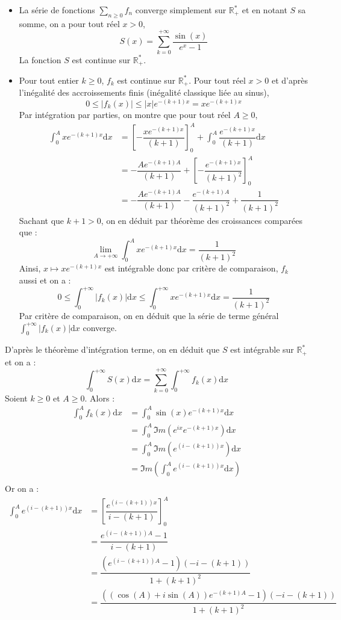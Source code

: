\documentclass[a4paper,twoside,french,10pt]{VcCours}
\newcommand{\dx}{\text{d}x}
\begin{document}
\begin{itemize}
\item La série de fonctions $\sum_{n \geq 0} f_n$ converge simplement sur $\mathbb{R}_+^*$ et en notant $S$ sa somme, on a pour tout réel $x>0$,
$$ S(x)= \sum_{k=0}^{+ \infty} \dfrac{\sin(x)}{e^x-1}$$
La fonction $S$ est continue sur $\mathbb{R}_+^*$.
\item Pour tout entier $k \geq 0$, $f_k$ est continue sur $\mathbb{R}_+^*$. Pour tout réel $x>0$ et d'après l'inégalité des accroissements finis (inégalité classique liée au sinus),
$$ 0 \leq \vert f_k(x) \vert \leq \vert x \vert e^{-(k+1)x} = x  e^{-(k+1)x}$$
Par intégration par parties, on montre que pour tout réel $A \geq 0$,
\begin{align*}
\int_0^{A} x e^{-(k+1)x} \dx & = \left[- \dfrac{xe^{-(k+1)x}}{(k+1)} \right]_0^A + \int_0^A \dfrac{e^{-(k+1)x}}{(k+1)} \dx \\
& = - \dfrac{Ae^{-(k+1)A}}{(k+1)} +  \left[- \dfrac{e^{-(k+1)x}}{(k+1)^2} \right]_0^A \\
& =  - \dfrac{Ae^{-(k+1)A}}{(k+1)} - \dfrac{e^{-(k+1)A}}{(k+1)^2} + \dfrac{1}{(k+1)^2}
\end{align*}
Sachant que $k+1>0$, on en déduit par théorème des croissances comparées que :
$$ \lim_{A \rightarrow + \infty} \int_0^{A} x e^{-(k+1)x} \dx = \dfrac{1}{(k+1)^2}$$
Ainsi, $x \mapsto x  e^{-(k+1)x}$ est intégrable donc par critère de comparaison, $f_k$ aussi et on a :
$$ 0 \leq \int_0^{+ \infty}\vert f_k(x) \vert \dx \leq  \int_0^{+ \infty} x  e^{-(k+1)x} \dx = \dfrac{1}{(k+1)^2}$$
Par critère de comparaison, on en déduit que la série de terme général $\int_0^{+ \infty}\vert f_k(x) \vert \dx$ converge.
\end{itemize}
D'après le théorème d'intégration terme, on en déduit que $S$ est intégrable sur $\mathbb{R}_+^*$ et on a :
$$ \int_0^{+ \infty} S(x) \dx = \sum_{k=0}^{+ \infty} \int_0^{+ \infty} f_k(x) \dx$$
Soient $k \geq 0$ et $A \geq 0$. Alors :
\begin{align*}
\int_0^A f_k(x) \dx &  = \int_0^A \sin(x) e^{-(k+1)x} \dx \\
& = \int_0^A \Im m(e^{ix}  e^{-(k+1)x}) \dx \\
& = \int_0^A \Im m(e^{(i-(k+1))x}) \dx \\
& = \Im m  \left(  \int_0^A e^{(i-(k+1))x} \dx \right) \\
\end{align*}
Or on a :
\begin{align*}
\int_0^A e^{(i-(k+1))x} \dx & = \left[ \dfrac{e^{(i-(k+1))x}}{i-(k+1)} \right]_0^A \\
& = \dfrac{e^{(i-(k+1))A} - 1}{i-(k+1)} \\
& = \dfrac{(e^{(i-(k+1))A} - 1)(-i-(k+1))}{1+(k+1)^2} \\
& = \dfrac{((\cos(A)+i \sin(A))e^{-(k+1)A} - 1)(-i-(k+1))}{1+(k+1)^2} 
\end{align*}
\end{document}
